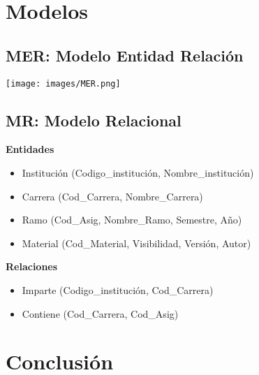 \documentclass[12pt,letterpaper]{article}
\begin{document}
\newpage
\section{Modelos}
\subsection{MER: Modelo Entidad Relación}
\texttt{[image: images/MER.png]}

\subsection{MR: Modelo Relacional}
\textbf{Entidades}

\begin{itemize}
\item Institución (Codigo\_institución, Nombre\_institución)
\item Carrera (Cod\_Carrera, Nombre\_Carrera)
\item Ramo (Cod\_Asig, Nombre\_Ramo, Semestre, Año)
\item Material (Cod\_Material, Visibilidad, Versión, Autor)
\end{itemize}

\textbf{Relaciones}
\begin{itemize}
\item Imparte (Codigo\_institución, Cod\_Carrera)
\item Contiene (Cod\_Carrera, Cod\_Asig)
\end{itemize}

\newpage
\section{Conclusión}
\lipsum[1-3]

\newpage
{}


\end{document}

